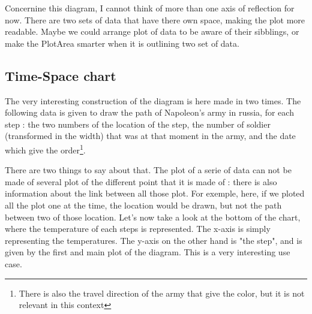 Concernine this diagram, I cannot think of more than one axis of reflection for now. There are two sets of data that have there own space, making the plot more readable. Maybe we could arrange plot of data to be aware of their sibblings, or make the PlotArea smarter when it is outlining two set of data.


\subsection{Time-Space chart}
The very interesting construction of the diagram is here made in two times. The following data is given to draw the path of Napoleon's army in russia, for each step : the two numbers of the location of the step, the number of soldier (transformed in the width) that was at that moment in the army, and the date which give the order\footnote{There is also the travel direction of the army that give the color, but it is not relevant in this context}.

There are two things to say about that. The plot of a serie of data can not be made of several plot of the different point that it is made of : there is also information about the link between all those plot. For exemple, here, if we ploted all the plot one at the time, the location would be drawn, but not the path between two of those location.
Let's now take a look at the bottom of the chart, where the temperature of each steps is represented. The x-axis is simply representing the temperatures. The y-axis on the other hand is "the step", and is given by the first and main plot of the diagram. This is a very interesting use case.
